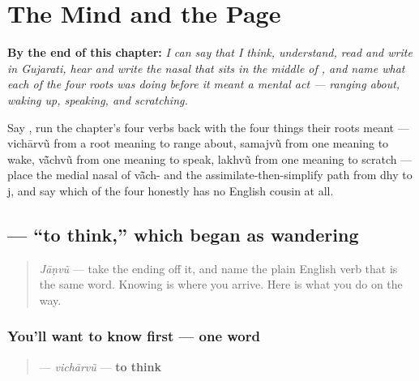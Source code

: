 
\chapter{The Mind and the Page}
\label{ch:gu-mind-and-page}

\begin{chapteropening}
\textbf{By the end of this chapter:} \emph{I can say that I think, understand, read and write in Gujarati, hear and write the nasal that sits in the middle of , and name what each of the four roots was doing before it meant a mental act — ranging about, waking up, speaking, and scratching.}

Say     , run the chapter's four verbs back with the four things their roots meant — vichārvũ from a root meaning to range about, samajvũ from one meaning to wake, vā̃chvũ from one meaning to speak, lakhvũ from one meaning to scratch — place the medial nasal of vā̃ch- and the assimilate-then-simplify path from dhy to j, and say which of the four honestly has no English cousin at all.
\end{chapteropening}

\section[vichārvũ]{ — \textquotedblleft{}to think,\textquotedblright{} which began as wandering}

\label{lesson:GU-C08-vicharvun}



\begin{quote}
\emph{Jāṇvũ} — take the ending off it, and name the plain English verb that is the same word. Knowing is where you arrive. Here is what you do on the way.
\end{quote}

\subsection*{You'll want to know first — one word}
\begin{quote}
\textbf{} — \emph{vichārvũ} — \textbf{to think}
\end{quote}


